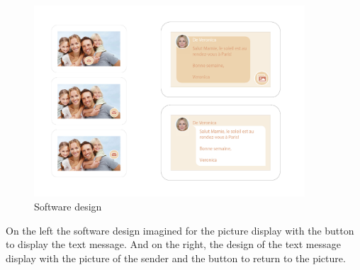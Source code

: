 \begin{figure}[!htb]
    \centering
    \includegraphics[width=0.9\textwidth,keepaspectratio]{chap/designFig/vesta_design.jpg}
    \caption{Software design}
    \label{fig:soft design}
\end{figure}

On the left the software design imagined for the picture display with the button to display the text message. And on the right, the design of the text message display with the picture of the sender and the button to return to the picture.
